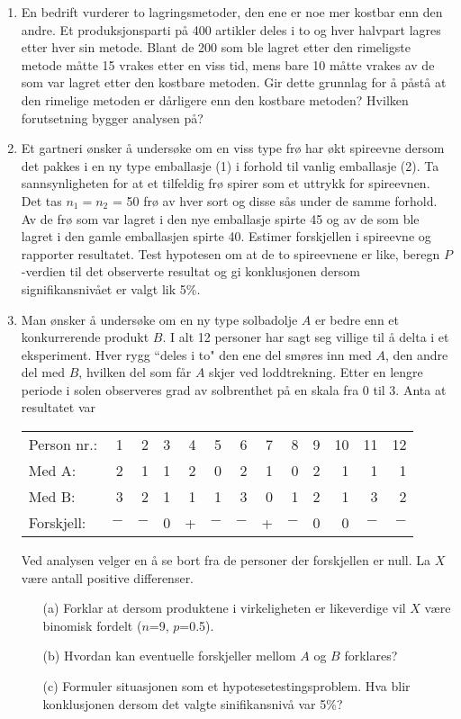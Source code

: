 \begin{enumerate}
\item
En bedrift vurderer to lagringsmetoder, den ene er noe mer kostbar enn
den andre.  Et produksjonsparti på 400 artikler deles i to og
hver halvpart lagres etter hver sin metode.  Blant de 200 som ble 
lagret etter den rimeligste metode måtte 15 vrakes etter en viss tid,
mens bare 10 måtte vrakes av de som var lagret etter den kostbare 
metoden.  Gir dette grunnlag for å påstå at den rimelige
metoden er dårligere enn den kostbare metoden?  Hvilken forutsetning 
bygger analysen på?

\item
Et gartneri ønsker å undersøke om en viss type frø har 
økt spireevne dersom det pakkes i en ny type emballasje (1) i 
forhold til vanlig emballasje (2).  Ta sannsynligheten for at et
tilfeldig frø spirer som et uttrykk for spireevnen.  Det tas
$n_1 = n_2$ = 50 frø av hver sort og disse sås under de samme 
forhold.  Av de frø som var lagret i den nye emballasje spirte 45
og av de som ble lagret i den gamle emballasjen spirte 40.  Estimer
forskjellen i spireevne og rapporter resultatet.  Test hypotesen om 
at de to spireevnene er like, beregn $P$-verdien til det observerte
resultat og gi konklusjonen dersom signifikansnivået er valgt lik
5\%.

\item
Man ønsker å undersøke om en ny type solbadolje $A$ er 
bedre enn et konkurrerende produkt $B$.  I alt 12 personer har sagt
seg villige til å delta i et eksperiment.  Hver rygg ``deles i to"
den ene del smøres inn med $A$, den andre del med $B$, hvilken del 
som får $A$ skjer ved loddtrekning.  Etter en lengre periode i
solen observeres grad av solbrenthet på en skala fra 0 til 3.
Anta at resultatet var
\begin{center}
\begin{tabular}{lrrrrrrrrrrrr}
Person nr.:  &   1 & 2 & 3 & 4 & 5 & 6 & 7 & 8 & 9 & 10 & 11 & 12 \\
Med A:       &   2 & 1 & 1 & 2 & 0 & 2 & 1 & 0 & 2 &  1 &  1 &  1 \\
Med B:       &   3 & 2 & 1 & 1 & 1 & 3 & 0 & 1 & 2 &  1 &  3 &  2 \\
Forskjell:   &  $-$&$-$& 0 & + &$-$&$-$& + &$-$& 0 &  0 & $-$& $-$
\end{tabular}
\end{center}
Ved analysen velger en å se bort fra de personer der forskjellen
er null.  La $X$ være antall positive differenser.

\begin{itemize}
\item[(a)] Forklar at dersom produktene i virkeligheten er likeverdige
vil $X$ være binomisk fordelt ($n$=9, $p$=0.5).
\item[(b)] Hvordan kan eventuelle forskjeller mellom $A$ og $B$ forklares?
\item[(c)] Formuler situasjonen som et hypotesetestingsproblem.  Hva
           blir konklusjonen dersom det valgte sinifikansnivå var 5\%?
\end{itemize}


\end{enumerate}
